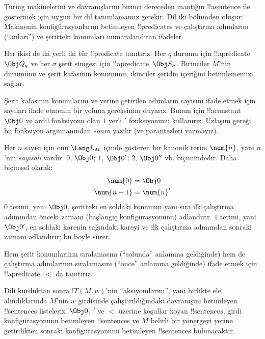 \documentclass[../../../include/open-logic-section]{subfiles}
\begin{document}

\begin{explain}
Turing makinelerini ve davranışlarını birinci dereceden mantığın
!!a{sentence} ile göstermek için uygun bir dil tanımlamamız gerekir. Dil iki
bölümden oluşur: Makinenin konfigürasyonlarını betimleyen !!{predicate}s ve
çalıştırma adımlarını (``anları'') ve şeritteki konumları numaralandıran
ifadeler.

Her ikisi de iki yerli iki tür !!{predicate} tanıtırız: Her $q$ durumu
için !!a{predicate}~$\Obj Q_q$ ve her $\sigma$ şerit simgesi için
!!a{predicate}~$\Obj S_\sigma$. Birinciler $M$'nin durumunu ve şerit kafasının
konumunu, ikinciler şeridin içeriğini betimlememizi sağlar.

Şerit kafasının konumlarını ve yerine getirilen adımların sayısını ifade etmek
için sayıları ifade etmenin bir yoluna gereksinim duyarız. Bunun için
!!a{constant}~$\Obj 0$ ve ardıl fonksiyonu olan $1$ yerli $\prime$
fonksiyonunu kullanırız. Uzlaşım gereği bu fonksiyon argümanından \emph{sonra}
yazılır (ve parantezleri yazmayız).

Her $n$ sayısı için onu $\Lang L_M$ içinde gösteren bir kanonik terim
$\num{n}$, yani $n$'nin \emph{sayısalı} vardır. $\num{0}$, $\Obj 0$;
$\num{1}$, $\Obj 0'$; $\num{2}$, $\Obj 0''$ vb. biçimindedir. Daha biçimsel
olarak:
\begin{align*}
\num{0} & = \Obj 0 \\
\num{n+1} &= \num{n}'
\end{align*}
$\num{0}$ terimi, yani $\Obj 0$, şeritteki en soldaki konumun yanı sıra ilk
çalıştırma adımından önceki zamanı (başlangıç konfigürasyonunu) adlandırır.
$\num{1}$ terimi, yani $\Obj 0'$, en soldaki karenin sağındaki kareyi ve ilk
çalıştırma adımından sonraki zamanı adlandırır; bu böyle sürer.

Hem şerit konumlarının sıralamasını (``solunda'' anlamına geldiğinde) hem de
çalıştırma adımlarının sıralamasını (``önce'' anlamına geldiğinde) ifade etmek
için !!a{predicate}~$<$ da tanıtırız.

Dili kurduktan sonra $!T(M,w)$'nin ``aksiyomlarını'', yani birlikte ele
alındıklarında $M$'nin $w$ girdisinde çalıştırıldığındaki davranışını
betimleyen !!{sentence}s listeleriz. $\Obj 0$, $\prime$ ve $<$ üzerine
koşullar koyan !!{sentence}s, girdi konfigürasyonunu betimleyen !!{sentence}s
ve $M$ belirli bir yönergeyi yerine getirdikten sonraki konfigürasyonunu
betimleyen !!{sentence}s bulunacaktır.
\end{explain}
\end{document}
